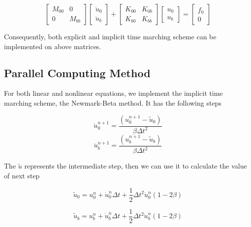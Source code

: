 \begin{equation}
\begin{bmatrix}
M_{00} & 0 \\ 0 & M_{bb}
\end{bmatrix}\begin{bmatrix}
\ddot{u}_{0} \\ \ddot{u}_{b}
\end{bmatrix} + \begin{bmatrix}
K_{00} & K_{0b} \\
K_{b0} & K_{bb} 
\end{bmatrix} \begin{bmatrix}
u_{0} \\ u_{b}
\end{bmatrix} = \begin{bmatrix}
f_{0} \\ 0
\end{bmatrix}
\end{equation}

Consequently, both explicit and implicit time marching scheme can be implemented on above matrices.

\subsection{Parallel Computing Method}

For both linear and nonlinear equations, we implement the implicit time marching scheme, the Newmark-Beta method. It has the following steps

\begin{equation}
\ddot{u}_{0}^{n+1} = \frac{(u_{0}^{n+1} - \tilde{u}_{0})}{\beta \Delta t^{2}}
\end{equation}
\begin{equation}
\ddot{u}_{b}^{n+1} = \frac{(u_{b}^{n+1} - \tilde{u}_{b})}{\beta \Delta t^{2}}
\end{equation}

The $ \tilde{u} $ represents the intermediate step, then we can use it to calculate the value of next step

\begin{equation}
\tilde{u}_{0} = u_{0}^{n} + \dot{u}_{0}^{n} \Delta t + \frac{1}{2} \Delta t^{2} \ddot{u}_{0}^{n} (1 - 2 \beta)
\end{equation}

\begin{equation}
\tilde{u}_{b} = u_{b}^{n} + \dot{u}_{b}^{n} \Delta t + \frac{1}{2} \Delta t^{2} \ddot{u}_{b}^{n} (1 - 2 \beta)
\end{equation}

